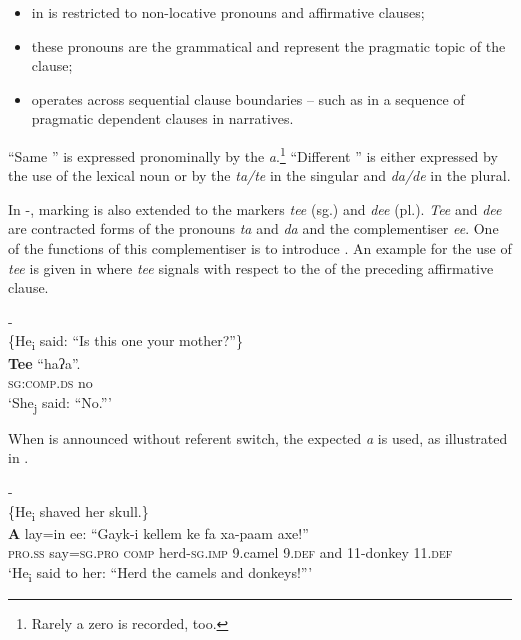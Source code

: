 \documentclass[output=paper
,newtxmath
,modfonts
,nonflat]{langsci/langscibook}
\begin{document}
\begin{itemize}
\item {} in  is restricted to non-locative   pronouns and affirmative clauses;

\item these pronouns are the grammatical  and represent the pragmatic topic of the clause;

\item {} operates across sequential clause boundaries -- such as in a sequence of pragmatic dependent clauses in narratives.
\end{itemize}

“Same ” is expressed pronominally by the  \textit{a}.\footnote{Rarely a zero  is recorded, too.}  “Different ” is either expressed by the use of the lexical noun or by the  \textit{ta/te} in the singular and \textit{da/de} in the plural.

In -,  marking is also extended to the  markers \textit{tee} (sg.) and \textit{dee} (pl.). \textit{Tee} and \textit{dee} are contracted forms of the pronouns \textit{ta} and \textit{da} and the complementiser \textit{ee}. One of the functions of this complementiser is to introduce . An example for the use of \textit{tee} is given in  where \textit{tee} signals  with respect to the  of the preceding affirmative clause. 

\ea\label{ex:apel:21}
{- \citep[285]{Faye1979}}\\
{\-\hspace{0cm}\{He\textsubscript{i} said: “Is this one your mother?”\}}\\
\gll \textbf{Tee} “haʔa”.\\
     \textsc{sg:comp.ds} no \\
\glt ‘She\textsubscript{j} said: “No.”’
\z

When  is announced without referent switch, the expected  \textit{a} is used, as illustrated in . 

\ea\label{ex:apel:22}
{- \citep[284]{Faye1979}}\\
{\-\hspace{0cm}\{He\textsubscript{i} shaved her skull.\}}\\
\gll \textbf{A} lay=in ee: “Gayk-i kellem ke fa xa-paam axe!”\\
     \textsc{pro.ss} say\textsc{=sg.pro} \textsc{comp} herd\textsc{-sg.imp} \textsc{9.}camel \textsc{9.def} and \textsc{11-}donkey \textsc{11.def} \\
\glt ‘He\textsubscript{i} said to her: “Herd the camels and donkeys!”’
\z
\end{document}
